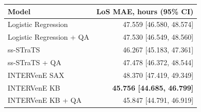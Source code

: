 \begin{tabular}{lr}
\toprule
Model & LoS MAE, hours (95\% CI) \\
\midrule
Logistic Regression & 47.559 [46.580, 48.574] \\
Logistic Regression + QA & 47.530 [46.549, 48.560] \\
ss-STraTS & 46.267 [45.183, 47.361] \\
ss-STraTS + QA & 47.478 [46.372, 48.544] \\
INTERVenE SAX & 48.370 [47.419, 49.349] \\
INTERVenE KB & \textbf{45.756 [44.685, 46.799]} \\
INTERVenE KB + QA & 45.847 [44.791, 46.919] \\
\bottomrule
\end{tabular}
